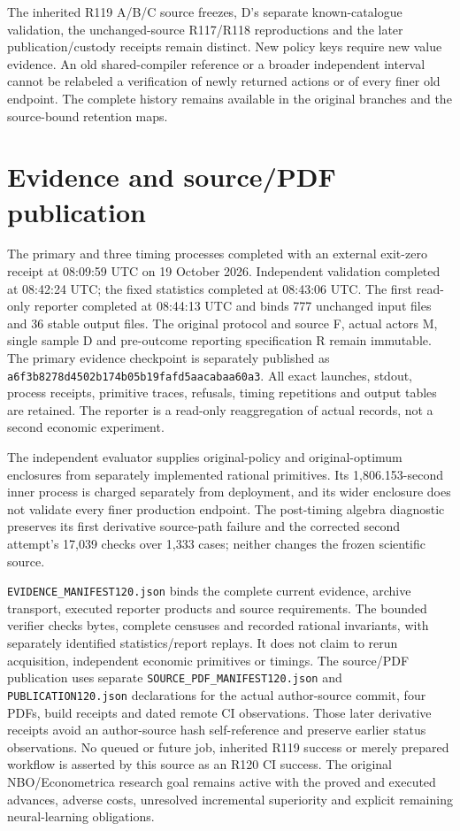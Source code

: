 The inherited R119 A/B/C source freezes, D's separate known-catalogue
validation, the unchanged-source R117/R118 reproductions and the later
publication/custody receipts remain distinct. New policy keys require new
value evidence. An old shared-compiler reference or a broader independent
interval cannot be relabeled a verification of newly returned actions or
of every finer old endpoint. The complete history remains available in
the original branches and the source-bound retention maps.

\section{Evidence and source/PDF publication}
The primary and three timing processes completed with an external exit-zero
receipt at 08:09:59 UTC on 19 October 2026. Independent validation completed
at 08:42:24 UTC; the fixed statistics completed at 08:43:06 UTC. The first
read-only reporter completed at 08:44:13 UTC and binds 777 unchanged input
files and 36 stable output files. The original protocol and source F,
actual actors M, single sample D and pre-outcome reporting specification R
remain immutable. The primary evidence checkpoint is separately published
as \nolinkurl{a6f3b8278d4502b174b05b19fafd5aacabaa60a3}.
All exact launches, stdout, process receipts, primitive traces, refusals,
timing repetitions and output tables are retained. The reporter is a
read-only reaggregation of actual records, not a second economic experiment.

The independent evaluator supplies original-policy and original-optimum
enclosures from separately implemented rational primitives. Its
1,806.153-second inner process is charged separately from deployment, and
its wider enclosure does not validate every finer production endpoint.
The post-timing algebra diagnostic preserves its first derivative
source-path failure and the corrected second attempt's 17,039 checks over
1,333 cases; neither changes the frozen scientific source.

\nolinkurl{EVIDENCE_MANIFEST120.json} binds the complete current evidence,
archive transport, executed reporter products and source requirements.
The bounded verifier checks bytes, complete censuses and recorded rational
invariants, with separately identified statistics/report replays. It does
not claim to rerun acquisition, independent economic primitives or timings.
The source/PDF publication uses separate
\nolinkurl{SOURCE_PDF_MANIFEST120.json} and
\nolinkurl{PUBLICATION120.json} declarations for the actual author-source
commit, four PDFs, build receipts and dated remote CI observations. Those
later derivative receipts avoid an author-source hash self-reference and
preserve earlier status observations. No queued or future job, inherited
R119 success or merely prepared workflow is asserted by this source as an
R120 CI success. The original NBO/Econometrica research goal remains active
with the proved and executed advances, adverse costs, unresolved
incremental superiority and explicit remaining neural-learning obligations.
